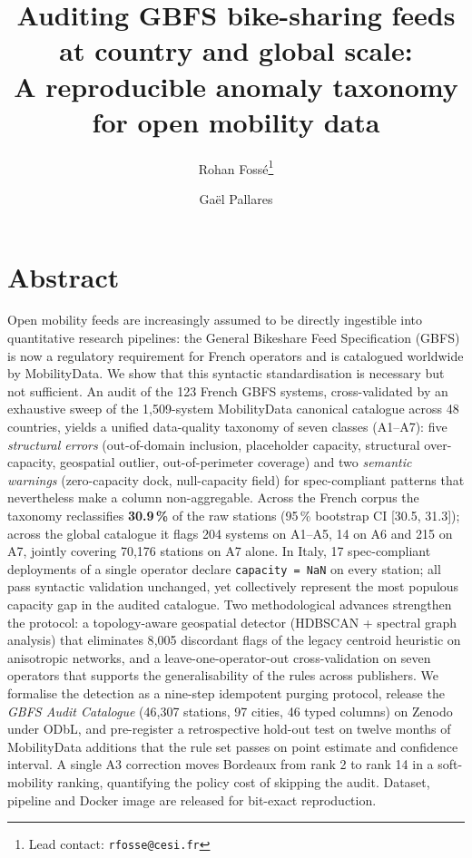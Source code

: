 \documentclass[11pt,a4paper]{article}
\title{\bfseries\sffamily\Large Auditing GBFS bike-sharing feeds at country and global scale:\\
A reproducible anomaly taxonomy for open mobility data}
\author[1]{Rohan Foss\'e\thanks{Lead contact: \texttt{rfosse@cesi.fr}}}
\author[2]{Ga\"el Pallares}
\affil[1]{CESI Engineering School, Montpellier, France}
\affil[2]{CESI LINEACT (EA 7527), Montpellier, France}
\date{}
\begin{document}
\maketitle

%

\section*{Abstract}
\noindent
Open mobility feeds are increasingly assumed to be directly ingestible
into quantitative research pipelines: the General Bikeshare Feed
Specification (GBFS) is now a regulatory requirement for French
operators and is catalogued worldwide by MobilityData. We show that
this syntactic standardisation is necessary but not sufficient. An
audit of the 123 French GBFS systems, cross-validated by an
exhaustive sweep of the 1{,}509-system MobilityData canonical
catalogue across 48 countries, yields a unified data-quality
taxonomy of seven classes (A1--A7): five \emph{structural errors}
(out-of-domain inclusion, placeholder capacity, structural
over-capacity, geospatial outlier, out-of-perimeter coverage) and
two \emph{semantic warnings} (zero-capacity dock, null-capacity
field) for spec-compliant patterns that nevertheless make a
column non-aggregable. Across the French corpus the taxonomy
reclassifies \textbf{30.9\,\%} of the raw stations (95\,\%
bootstrap CI [30.5, 31.3]); across the global catalogue it flags
204 systems on A1--A5, 14 on A6 and 215 on A7, jointly covering
70{,}176 stations on A7 alone. In Italy, 17 spec-compliant deployments of a single
operator declare \texttt{capacity = NaN} on every station;
all pass syntactic validation unchanged, yet collectively
represent the most populous capacity gap in the audited
catalogue. Two methodological advances strengthen the protocol:
a topology-aware geospatial detector (HDBSCAN + spectral graph
analysis) that eliminates 8{,}005 discordant flags of the legacy
centroid heuristic on anisotropic networks, and a
leave-one-operator-out cross-validation on seven operators that
supports the generalisability of the rules across publishers. We
formalise the detection as a nine-step idempotent purging protocol,
release the \emph{GBFS Audit Catalogue} (46{,}307 stations,
97 cities, 46 typed columns) on Zenodo under ODbL, and pre-register
a retrospective hold-out test on twelve months of MobilityData
additions that the rule set passes on point estimate and confidence
interval. A single A3 correction moves Bordeaux from rank 2 to
rank 14 in a soft-mobility ranking, quantifying the policy cost of
skipping the audit. Dataset, pipeline and Docker image are released
for bit-exact reproduction.
\end{document}
